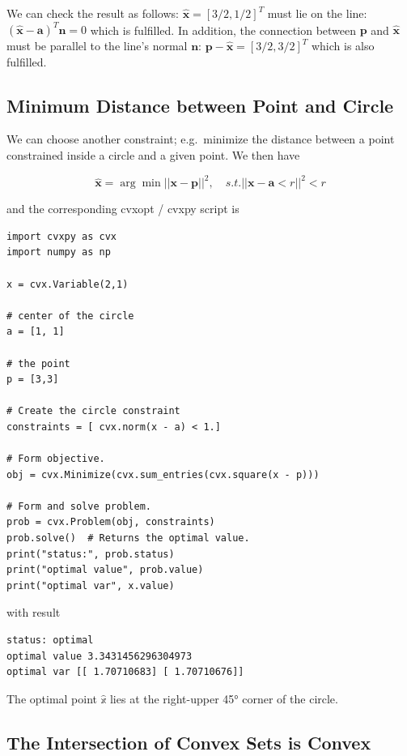 We can check the result as follows: \(\hat{\mathbf{x}} = [3/2, 1/2]^T\) must lie on the line: \((\hat{\mathbf{x}} - \mathbf{a})^T \mathbf{n} = 0\) which is fulfilled. In addition, the connection between \(\mathbf{p}\) and \(\hat{\mathbf{x}}\) must be parallel to the line's normal \(\mathbf{n}\): \(\mathbf{p} - \hat{\mathbf{x}} = [3/2, 3/2]^T\) which is also fulfilled.

\subsection{Minimum Distance between Point and Circle}

We can choose another constraint; e.g.~minimize the distance between a point constrained inside a circle and a given point. We then have

\[
\hat{\mathbf{x}} = \arg \min || \mathbf{x} - \mathbf{p} ||^2, \quad s.t. || \mathbf{x}-\mathbf{a} < r||^2 < r
\]

and the corresponding cvxopt / cvxpy script is

\begin{verbatim}
import cvxpy as cvx
import numpy as np

x = cvx.Variable(2,1)

# center of the circle
a = [1, 1]

# the point
p = [3,3]

# Create the circle constraint
constraints = [ cvx.norm(x - a) < 1.]

# Form objective.
obj = cvx.Minimize(cvx.sum_entries(cvx.square(x - p)))

# Form and solve problem.
prob = cvx.Problem(obj, constraints)
prob.solve()  # Returns the optimal value.
print("status:", prob.status)
print("optimal value", prob.value)
print("optimal var", x.value)
\end{verbatim}

with result

\begin{verbatim}
status: optimal
optimal value 3.3431456296304973
optimal var [[ 1.70710683] [ 1.70710676]]
\end{verbatim}

The optimal point \(\hat{\mathbb{x}}\) lies at the right-upper 45° corner of the circle.

\subsection{The Intersection of Convex Sets is Convex}

